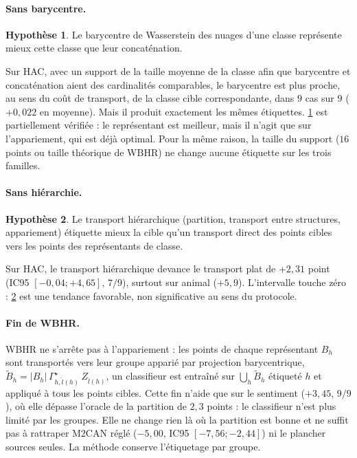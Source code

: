 \documentclass[11pt,a4paper]{article}
\theoremstyle{definition}
\newtheorem{hypothese}{Hypothèse}
\theoremstyle{remark}
\newcommand{\abs}[1]{\left\lvert #1 \right\rvert}
\begin{document}
\paragraph{Sans barycentre.}
\begin{hypothese}\label{hyp-h1}
Le barycentre de Wasserstein des nuages d'une classe représente mieux cette classe que leur concaténation.
\end{hypothese}
Sur HAC, avec un support de la taille moyenne de la classe afin que barycentre et concaténation aient des cardinalités
comparables, le barycentre est plus proche, au sens du coût de transport, de la classe cible correspondante, dans
$9$ cas sur $9$ ($+0{,}022$ en moyenne). Mais il produit exactement les mêmes étiquettes. \cref{hyp-h1} est
partiellement vérifiée : le représentant est meilleur, mais il n'agit que sur l'appariement, qui est déjà optimal. Pour
la même raison, la taille du support ($16$ points ou taille théorique de WBHR) ne change aucune étiquette sur les trois
familles.

\paragraph{Sans hiérarchie.}
\begin{hypothese}\label{hyp-h2}
Le transport hiérarchique (partition, transport entre structures, appariement) étiquette mieux la cible qu'un transport
direct des points cibles vers les points des représentants de classe.
\end{hypothese}
Sur HAC, le transport hiérarchique devance le transport plat de $+2{,}31$ point (IC95 $[-0{,}04 ; +4{,}65]$, $7/9$),
surtout sur animal ($+5{,}9$). L'intervalle touche zéro : \cref{hyp-h2} est une tendance favorable, non significative au
sens du protocole.

\paragraph{Fin de WBHR.}
WBHR ne s'arrête pas à l'appariement : les points de chaque représentant $B_h$ sont transportés vers leur groupe apparié
par projection barycentrique, $\tilde B_h = \abs{B_h}\, \Gamma^\star_{h, \hat l(h)}\, Z_{\hat l(h)}$, un classifieur est
entraîné sur $\bigcup_h \tilde B_h$ étiqueté $h$ et appliqué à tous les points cibles. Cette fin n'aide que sur le
sentiment ($+3{,}45$, $9/9$), où elle dépasse l'oracle de la partition de $2{,}3$ points : le classifieur n'est plus
limité par les groupes. Elle ne change rien là où la partition est bonne et ne suffit pas à rattraper M2CAN réglé
($-5{,}00$, IC95 $[-7{,}56 ; -2{,}44]$) ni le plancher sources seules. La méthode conserve l'étiquetage par groupe.
\end{document}
